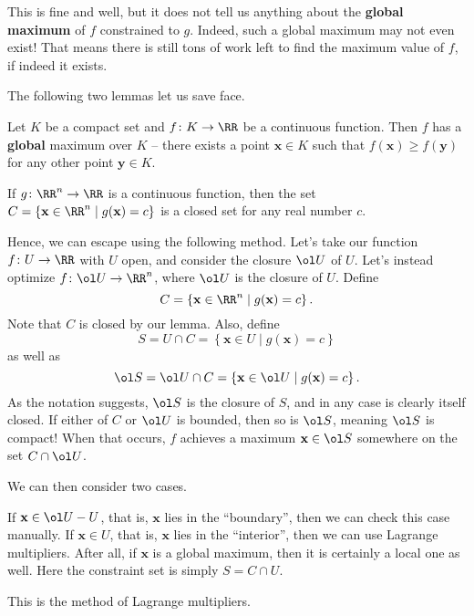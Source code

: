 \documentclass[11pt]{scrartcl}
\begin{document}
This is fine and well, but it does not tell us anything
about the \textbf{global maximum} of $f$ constrained to $g$.
Indeed, such a global maximum may not even exist!
That means there is still tons of work left to
find the maximum value of $f$, if indeed it exists.

The following two lemmas let us save face.
\begin{lemma}
  Let $K$ be a compact set and $f \colon K \to \RR$
  be a continuous function.
  Then $f$ has a \textbf{global} maximum over $K$ --
  there exists a point $\mathbf x \in K$
  such that $f(\mathbf x) \ge f(\mathbf y)$
  for any other point $\mathbf y \in K$.
\end{lemma}
\begin{lemma}
  If $g \colon \RR^n \to \RR$ is a continuous function,
  then the set
  $C = \left\{ \mathbf x \in \RR^n \mid g(\mathbf x) = c \right\}$
  is a closed set for any real number $c$.
\end{lemma}

Hence, we can escape using the following method.
Let's take our function $f \colon U \to \RR$
with $U$ open, and consider the closure $\ol U$ of $U$.
Let's instead optimize $f \colon \ol U \to \RR^n$,
where $\ol U$ is the closure of $U$. Define
\[ C = \left\{ \mathbf x \in \RR^n \mid g(\mathbf x) = c \right\}. \]
Note that $C$ is closed by our lemma. Also, define
\[ S = U \cap C =
  \left\{ \mathbf x \in U \mid g(\mathbf x) = c \right\} \]
as well as
\[ \ol S = \ol U \cap C =
  \left\{ \mathbf x \in \ol U \mid g(\mathbf x) = c \right\}. \]
As the notation suggests, $\ol S$ is the closure of $S$,
and in any case is clearly itself closed.
If either of $C$ or $\ol U$ is bounded,
then so is $\ol S$, meaning $\ol S$ is compact!
When that occurs, $f$ achieves a maximum $\mathbf x \in \ol S$
somewhere on the set $C \cap \ol U$.

We can then consider two cases.
\begin{itemize}
  \ii If $\mathbf x \in \ol U - U$,
  that is, $\mathbf x$ lies in the ``boundary'',
  then we can check this case manually.
  \ii If $\mathbf x \in U$, that is,
  $\mathbf x$ lies in the ``interior'',
  then we can use Lagrange multipliers.
  After all, if $\mathbf x$ is a global maximum,
  then it is certainly a local one as well.
  Here the constraint set is simply $S = C \cap U$.
\end{itemize}

This is the method of Lagrange multipliers.
\end{document}

